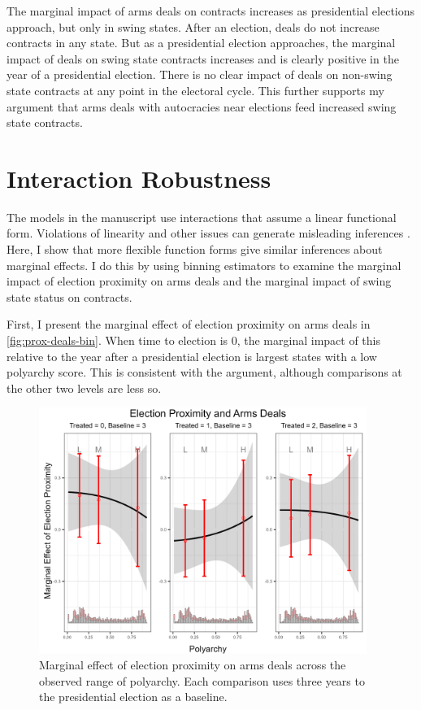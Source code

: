 \documentclass[12pt]{article}
\begin{document}
The marginal impact of arms deals on contracts increases as presidential elections approach, but only in swing states. 
After an election, deals do not increase contracts in any state. 
But as a presidential election approaches, the marginal impact of deals on swing state contracts increases and is clearly positive in the year of a presidential election. 
There is no clear impact of deals on non-swing state contracts at any point in the electoral cycle. 
This further supports my argument that arms deals with autocracies near elections feed increased swing state contracts. 


\section{Interaction Robustness}

The models in the manuscript use interactions that assume a linear functional form. 
Violations of linearity and other issues can generate misleading inferences \citep{Hainmuelleretal2019}. 
Here, I show that more flexible function forms give similar inferences about marginal effects. 
I do this by using binning estimators to examine the marginal impact of election proximity on arms deals and the marginal impact of swing state status on contracts.


First, I present the marginal effect of election proximity on arms deals in \autoref{fig:prox-deals-bin}.
When time to election is 0, the marginal impact of this relative to the year after a presidential election is largest states with a low polyarchy score. 
This is consistent with the argument, although comparisons at the other two levels are less so. 



\begin{figure}[htpb]
	\centering
		\includegraphics[width=0.95\textwidth]{prox-deals-bin.png}
	\caption{Marginal effect of election proximity on arms deals across the observed range of polyarchy. Each comparison uses three years to the presidential election as a baseline.}
	\label{fig:prox-deals-bin}
\end{figure}
\end{document}
